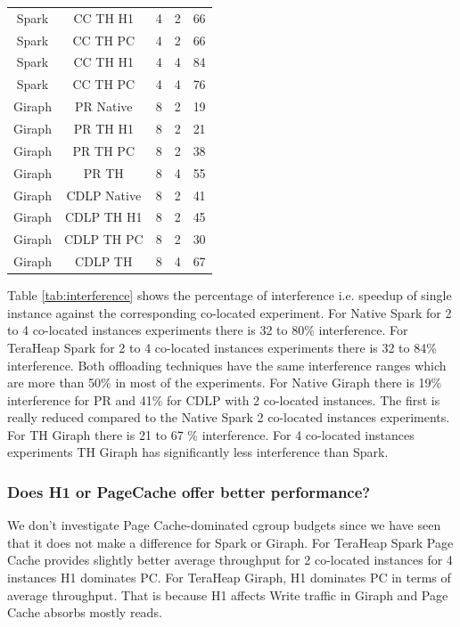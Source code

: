 \begin{table}[thbp]
\begin{tabular}{|c|c|c|c|c|}
          Spark & CC TH H1 & 4 & 2 & 66 \\
          Spark & CC TH PC & 4 & 2 & 66 \\
          Spark & CC TH H1 & 4 & 4 & 84  \\
          Spark & CC TH PC & 4 & 4 & 76 \\
          Giraph & PR Native & 8 & 2 & 19 \\
          Giraph & PR TH H1 & 8 & 2 & 21 \\
          Giraph & PR TH PC & 8 & 2 & 38 \\
          Giraph & PR TH & 8 & 4 & 55 \\
          Giraph & CDLP Native & 8 & 2 & 41 \\
          Giraph & CDLP TH H1 & 8 & 2 & 45 \\
          Giraph & CDLP TH PC & 8 & 2 & 30 \\
          Giraph & CDLP TH & 8 & 4 & 67 \\
    \hline
  \end{tabular}
\end{table}

Table \ref{tab:interference} shows the percentage of interference i.e. speedup of single instance against the corresponding co-located experiment. For Native Spark for 2 to 4 co-located instances experiments there is 32 to 80\% interference. For TeraHeap Spark for 2 to 4 co-located instances experiments there is 32 to 84\% interference. Both offloading techniques have the same interference ranges which are more than 50\% in most of the experiments. For Native Giraph there is 19\% interference for PR and 41\% for CDLP with 2 co-located instances. The first is really reduced compared to the Native Spark 2 co-located instances experiments. For TH Giraph there is 21 to 67 \% interference. For 4 co-located instances experiments TH Giraph has significantly less interference than Spark. 

\subsubsection{Does H1 or PageCache offer better performance?}
We don't investigate Page Cache-dominated cgroup budgets since we have seen that it does not make a difference for Spark or Giraph. For TeraHeap Spark Page Cache provides slightly better average throughput for 2 co-located instances for 4 instances H1 dominates PC. For TeraHeap Giraph, H1 dominates PC in terms of average throughput. That is because H1 affects Write traffic in Giraph and Page Cache absorbs mostly reads.

